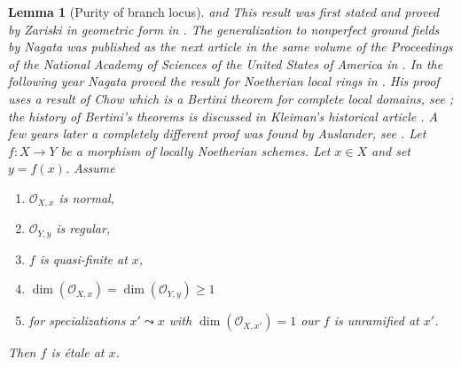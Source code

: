 \documentclass{stacks-project}
\newenvironment{reference}{\comment}{\endcomment}
\newenvironment{history}{\comment}{\endcomment}
\theoremstyle{plain}
\newtheorem{lemma}[subsection]{Lemma}
\theoremstyle{definition}
\theoremstyle{remark}
\numberwithin{equation}{subsection}
\begin{document}
\begin{lemma}[Purity of branch locus]
\label{lemma-purity}
\begin{reference}
\cite{Nagata-Purity} and \cite[Exp. X, Thm. 3.1]{SGA1}
\end{reference}
\begin{history}
This result was first stated and proved by Zariski in
geometric form in \cite{Zariski-Purity}.
The generalization to nonperfect ground fields by Nagata
was published as the next article in the same volume of the
Proceedings of the National Academy of Sciences of the United States of America
in \cite{Nagata-Remarks-Purity}. In the following year Nagata
proved the result for Noetherian local rings in \cite{Nagata-Purity}.
His proof uses a result of Chow which is a Bertini theorem for
complete local domains, see \cite{Chow-Bertini};
the history of Bertini's theorems is discussed in
Kleiman's historical article \cite{Kleiman-Bertini}.
A few years later a completely different proof was found by
Auslander, see \cite{Auslander-Purity}.
\end{history}
Let $f : X \to Y$ be a morphism of locally Noetherian schemes.
Let $x \in X$ and set $y = f(x)$. Assume
\begin{enumerate}
\item $\mathcal{O}_{X, x}$ is normal,
\item $\mathcal{O}_{Y, y}$ is regular,
\item $f$ is quasi-finite at $x$,
\item $\dim(\mathcal{O}_{X, x}) = \dim(\mathcal{O}_{Y, y}) \geq 1$
\item for specializations $x' \leadsto x$ with
$\dim(\mathcal{O}_{X, x'}) = 1$ our $f$ is unramified at $x'$.
\end{enumerate}
Then $f$ is \'etale at $x$.
\end{lemma}
\end{document}

